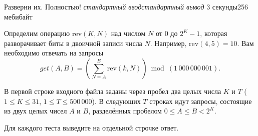 \begin{problem}{Разверни их. Полностью!}
{\textsl{стандартный ввод}}{\textsl{стандартный вывод}}
{3 секунды}{256 мебибайт}{}

Определим операцию $\mathrm{rev} (K, N)$ над числом $N$
от $0$ до $2^K - 1$, которая разворачивает биты в двоичной записи числа $N$.
Например, $\mathrm{rev} (4, 5) = 10$.
Вам необходимо отвечать на запросы
$$get(A, B) = (\sum\limits_{N = A}^{B} \mathrm{rev} (k, N))
  \bmod (1\,000\,000\,001)\text{.}$$

\InputFile

В первой строке входного файла заданы через пробел два целых числа $K$ и $T$
($1 \le K \le 31$, $1 \le T \le 500\,000$).
В следующих $T$ строках идут запросы, состоящие из двух целых
чисел $A$ и $B$, разделённых пробелом
$0 \le A \le B < 2^{K}$.

\OutputFile

Для каждого теста выведите на отдельной строчке ответ.

\Examples

\begin{example}%
%
%
\end{example}

\end{problem}
